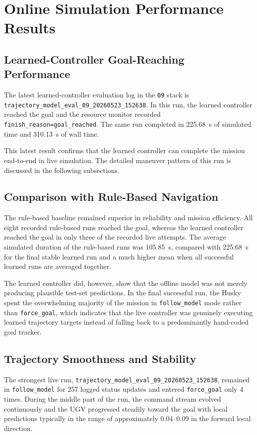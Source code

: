 \section{Online Simulation Performance Results}

\subsection{Learned-Controller Goal-Reaching Performance}

The latest learned-controller evaluation log in the \texttt{09} stack is \texttt{trajectory\_model\_eval\_09\_20260523\_152638}. In this run, the learned controller reached the goal and the resource monitor recorded \texttt{finish\_reason=goal\_reached}. The same run completed in 225.68~s of simulated time and 310.13~s of wall time.

This latest result confirms that the learned controller can complete the mission end-to-end in live simulation. The detailed maneuver pattern of this run is discussed in the following subsections.

\subsection{Comparison with Rule-Based Navigation}

The rule-based baseline remained superior in reliability and mission efficiency. All eight recorded rule-based runs reached the goal, whereas the learned controller reached the goal in only three of the recorded live attempts. The average simulated duration of the rule-based runs was 105.85~s, compared with 225.68~s for the final stable learned run and a much higher mean when all successful learned runs are averaged together.

The learned controller did, however, show that the offline model was not merely producing plausible test-set predictions. In the final successful run, the Husky spent the overwhelming majority of the mission in \texttt{follow\_model} mode rather than \texttt{force\_goal}, which indicates that the live controller was genuinely executing learned trajectory targets instead of falling back to a predominantly hand-coded goal tracker.

\subsection{Trajectory Smoothness and Stability}

The strongest live run, \texttt{trajectory\_model\_eval\_09\_20260523\_152638}, remained in \texttt{follow\_model} for 257 logged status updates and entered \texttt{force\_goal} only 4 times. During the middle part of the run, the command stream evolved continuously and the UGV progressed steadily toward the goal with local predictions typically in the range of approximately 0.04--0.09 in the forward local direction.

